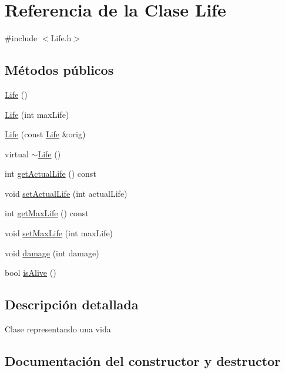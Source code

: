 \hypertarget{classLife}{}\section{Referencia de la Clase Life}
\label{classLife}


{\ttfamily \#include $<$Life.\+h$>$}

\subsection*{Métodos públicos}
\begin{DoxyCompactItemize}
\item 
\hyperlink{classLife_a6de2a371f6f778f8b4938d219390b746}{Life} ()
\item 
\hyperlink{classLife_a2964d51ba57add1054e4dca7b9267511}{Life} (int max\+Life)
\item 
\hyperlink{classLife_a5654f86257b68469dd966eed44a5d1d6}{Life} (const \hyperlink{classLife}{Life} \&orig)
\item 
virtual \hyperlink{classLife_ac5a521e06906fb4f834001b2b4f7adc7}{$\sim$\+Life} ()
\item 
int \hyperlink{classLife_adc50ff45896057a22eff164c26ff2c97}{get\+Actual\+Life} () const 
\item 
void \hyperlink{classLife_afc63b290a513272974e117191326d175}{set\+Actual\+Life} (int actual\+Life)
\item 
int \hyperlink{classLife_ad14340558348956867f68369a2b0f642}{get\+Max\+Life} () const 
\item 
void \hyperlink{classLife_ad02aacd2902ea4e626aa6bf45dc53e49}{set\+Max\+Life} (int max\+Life)
\item 
void \hyperlink{classLife_aa9fb062c056f19b5cc0bf60360dfff73}{damage} (int damage)
\item 
bool \hyperlink{classLife_ad596f5eaf723c8188a8043beb0437ef2}{is\+Alive} ()
\end{DoxyCompactItemize}


\subsection{Descripción detallada}
Clase representando una vida 

\subsection{Documentación del constructor y destructor}
\hypertarget{classLife_a6de2a371f6f778f8b4938d219390b746}{}
